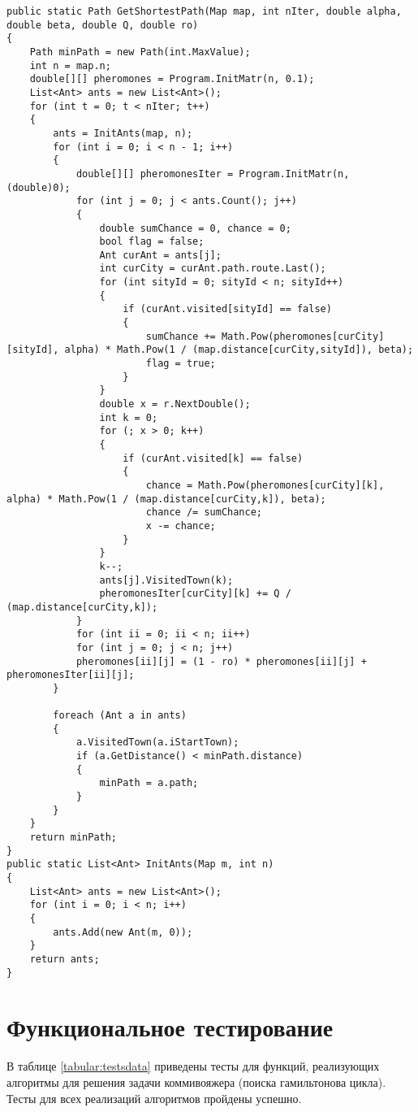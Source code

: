 \begin{center}
\begin{lstlisting}[label=l2, caption={Реализация муравьиного алгоритма}]
     public static Path GetShortestPath(Map map, int nIter, double alpha, double beta, double Q, double ro)
{
	Path minPath = new Path(int.MaxValue);
	int n = map.n;
	double[][] pheromones = Program.InitMatr(n, 0.1);
	List<Ant> ants = new List<Ant>();
	for (int t = 0; t < nIter; t++)
	{
		ants = InitAnts(map, n);
		for (int i = 0; i < n - 1; i++)
		{
			double[][] pheromonesIter = Program.InitMatr(n, (double)0); 
			for (int j = 0; j < ants.Count(); j++) 
			{
				double sumChance = 0, chance = 0;
				bool flag = false;
				Ant curAnt = ants[j];
				int curCity = curAnt.path.route.Last();
				for (int sityId = 0; sityId < n; sityId++) 
				{
					if (curAnt.visited[sityId] == false)
					{
						sumChance += Math.Pow(pheromones[curCity][sityId], alpha) * Math.Pow(1 / (map.distance[curCity,sityId]), beta); 
						flag = true;
					}
				}
				double x = r.NextDouble();
				int k = 0;
				for (; x > 0; k++)
				{
					if (curAnt.visited[k] == false)
					{
						chance = Math.Pow(pheromones[curCity][k], alpha) * Math.Pow(1 / (map.distance[curCity,k]), beta);
						chance /= sumChance;
						x -= chance;
					}
				}
				k--;
				ants[j].VisitedTown(k);
				pheromonesIter[curCity][k] += Q / (map.distance[curCity,k]);
			}
			for (int ii = 0; ii < n; ii++)
			for (int j = 0; j < n; j++)
			pheromones[ii][j] = (1 - ro) * pheromones[ii][j] + pheromonesIter[ii][j];
		}
		
		foreach (Ant a in ants)
		{
			a.VisitedTown(a.iStartTown);
			if (a.GetDistance() < minPath.distance)
			{
				minPath = a.path;
			}
		}                
	}
	return minPath;
}
public static List<Ant> InitAnts(Map m, int n)
{
	List<Ant> ants = new List<Ant>();
	for (int i = 0; i < n; i++)
	{
		ants.Add(new Ant(m, 0));
	}
	return ants;
}
\end{lstlisting}
\end{center}
\section{Функциональное тестирование}
В таблице \ref{tabular:testsdata} приведены тесты для функций, реализующих алгоритмы для решения задачи коммивояжера (поиска гамильтонова цикла). Тесты для всех реализаций алгоритмов пройдены успешно.

